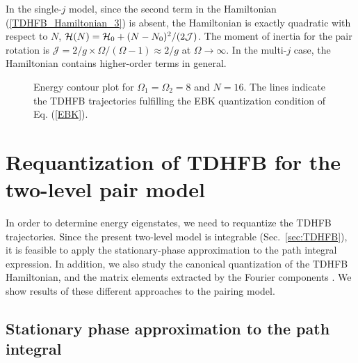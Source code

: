 \documentclass[%
superscriptaddress,
preprint,
showpacs,
nofootinbib,
amsmath,amssymb,
prc,
floatfix ]%
{revtex4-1}
\begin{document}
In the single-$j$ model, since the second term in the Hamiltonian
(\ref{TDHFB_Hamiltonian_3}) is absent,
the Hamiltonian is exactly quadratic with respect to $N$,
$\mathcal{H}(N) = \mathcal{H}_0+(N-N_0)^2/(2\cal{J})$.
The moment of inertia for the pair rotation is 
$\mathcal{J}=2/g\times\Omega/(\Omega-1)\approx 2/g$
at $\Omega\rightarrow\infty$.
In the multi-$j$ case, the Hamiltonian contains higher-order
terms in general.

\begin{figure}[htbp]
 \begin{center}
 \end{center}
 \caption{Energy contour plot for $\Omega_1=\Omega_2=8$ and $N=16$.
	The lines indicate the TDHFB trajectories fulfilling
	the EBK quantization condition of Eq. (\ref{EBK}).
	}
 \label{fig:phase_space}
\end{figure}


\section{Requantization of TDHFB for the two-level pair model}
\label{sec:requantization}

In order to determine energy eigenstates,
we need to requantize the TDHFB trajectories.
Since the present two-level model is integrable (Sec.~\ref{sec:TDHFB}),
it is feasible to apply the stationary-phase approximation to
the path integral expression.
In addition, we also study the canonical quantization of the TDHFB
Hamiltonian, and the matrix elements extracted by the Fourier components
\cite{CDS84}.
We show results of these different approaches to the pairing model.


\subsection{Stationary phase approximation to the path integral}
\label{sec:SPA}
\end{document}
